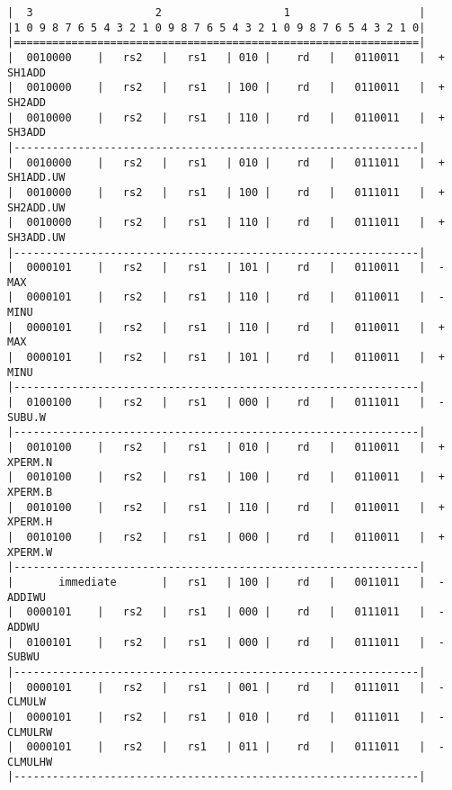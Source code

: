 \begin{minipage}{\linewidth}
\begin{verbatim}
|  3                   2                   1                    |
|1 0 9 8 7 6 5 4 3 2 1 0 9 8 7 6 5 4 3 2 1 0 9 8 7 6 5 4 3 2 1 0|
|===============================================================|
|  0010000    |   rs2   |   rs1   | 010 |    rd   |   0110011   |  + SH1ADD
|  0010000    |   rs2   |   rs1   | 100 |    rd   |   0110011   |  + SH2ADD
|  0010000    |   rs2   |   rs1   | 110 |    rd   |   0110011   |  + SH3ADD
|---------------------------------------------------------------|
|  0010000    |   rs2   |   rs1   | 010 |    rd   |   0111011   |  + SH1ADD.UW
|  0010000    |   rs2   |   rs1   | 100 |    rd   |   0111011   |  + SH2ADD.UW
|  0010000    |   rs2   |   rs1   | 110 |    rd   |   0111011   |  + SH3ADD.UW
|---------------------------------------------------------------|
|  0000101    |   rs2   |   rs1   | 101 |    rd   |   0110011   |  - MAX
|  0000101    |   rs2   |   rs1   | 110 |    rd   |   0110011   |  - MINU
|  0000101    |   rs2   |   rs1   | 110 |    rd   |   0110011   |  + MAX
|  0000101    |   rs2   |   rs1   | 101 |    rd   |   0110011   |  + MINU
|---------------------------------------------------------------|
|  0100100    |   rs2   |   rs1   | 000 |    rd   |   0111011   |  - SUBU.W
|---------------------------------------------------------------|
|  0010100    |   rs2   |   rs1   | 010 |    rd   |   0110011   |  + XPERM.N
|  0010100    |   rs2   |   rs1   | 100 |    rd   |   0110011   |  + XPERM.B
|  0010100    |   rs2   |   rs1   | 110 |    rd   |   0110011   |  + XPERM.H
|  0010100    |   rs2   |   rs1   | 000 |    rd   |   0110011   |  + XPERM.W
|---------------------------------------------------------------|
|       immediate       |   rs1   | 100 |    rd   |   0011011   |  - ADDIWU
|  0000101    |   rs2   |   rs1   | 000 |    rd   |   0111011   |  - ADDWU
|  0100101    |   rs2   |   rs1   | 000 |    rd   |   0111011   |  - SUBWU
|---------------------------------------------------------------|
|  0000101    |   rs2   |   rs1   | 001 |    rd   |   0111011   |  - CLMULW
|  0000101    |   rs2   |   rs1   | 010 |    rd   |   0111011   |  - CLMULRW
|  0000101    |   rs2   |   rs1   | 011 |    rd   |   0111011   |  - CLMULHW
|---------------------------------------------------------------|
\end{verbatim}
\end{minipage}


